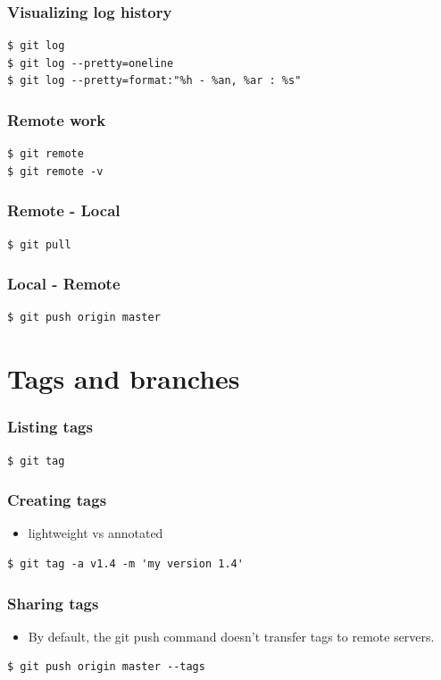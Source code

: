\documentclass{beamer}
\begin{document}
\begin{frame}[fragile]
\frametitle{Visualizing log history}
\begin{lstlisting}
$ git log
$ git log --pretty=oneline
$ git log --pretty=format:"%h - %an, %ar : %s"
\end{lstlisting}
\end{frame}

\begin{frame}[fragile]
\frametitle{Remote work}
\begin{lstlisting}
$ git remote
$ git remote -v
\end{lstlisting}
\end{frame}

\begin{frame}[fragile]
\frametitle{Remote - Local}
\begin{lstlisting}
$ git pull
\end{lstlisting}
\end{frame}

\begin{frame}[fragile]
\frametitle{Local - Remote}
\begin{lstlisting}
$ git push origin master
\end{lstlisting}
\end{frame}

\section{Tags and branches}
\frame{\insertsection}

\begin{frame}[fragile]
\frametitle{Listing tags}
\begin{lstlisting}
$ git tag
\end{lstlisting}
\end{frame}

\begin{frame}[fragile]
\frametitle{Creating tags}
\begin{itemize}
  \item lightweight vs annotated
\end{itemize}
\begin{lstlisting}
$ git tag -a v1.4 -m 'my version 1.4'
\end{lstlisting}
\end{frame}

\begin{frame}[fragile]
\frametitle{Sharing tags}
\begin{itemize}
  \item By default, the git push command doesn’t transfer tags to remote
servers.
\end{itemize}
\begin{lstlisting}
$ git push origin master --tags
\end{lstlisting}
\end{frame}
\end{document}
